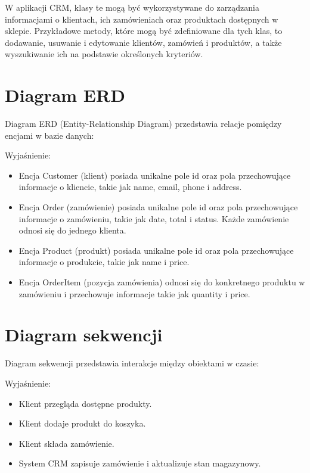 \documentclass[12pt,a4paper]{article}
\begin{document}
W aplikacji CRM, klasy te mogą być wykorzystywane do zarządzania informacjami o klientach, ich zamówieniach oraz produktach dostępnych w sklepie. Przykładowe metody, które mogą być zdefiniowane dla tych klas, to dodawanie, usuwanie i edytowanie klientów, zamówień i produktów, a także wyszukiwanie ich na podstawie określonych kryteriów.

\newpage

\section{Diagram ERD}
Diagram ERD (Entity-Relationship Diagram) przedstawia relacje pomiędzy encjami w bazie danych:

\vspace{12pt}Wyjaśnienie:
\begin{itemize}
    \item Encja Customer (klient) posiada unikalne pole id oraz pola przechowujące informacje o kliencie, takie jak name, email, phone i address.
    \item Encja Order (zamówienie) posiada unikalne pole id oraz pola przechowujące informacje o zamówieniu, takie jak date, total i status. Każde zamówienie odnosi się do jednego klienta.
    \item Encja Product (produkt) posiada unikalne pole id oraz pola przechowujące informacje o produkcie, takie jak name i price.
    \item Encja OrderItem (pozycja zamówienia) odnosi się do konkretnego produktu w zamówieniu i przechowuje informacje takie jak quantity i price.
\end{itemize}

\newpage

\section{Diagram sekwencji}
Diagram sekwencji przedstawia interakcje między obiektami w czasie:

\vspace{12pt}Wyjaśnienie:
\begin{itemize}
    \item Klient przegląda dostępne produkty.
    \item Klient dodaje produkt do koszyka.
    \item Klient składa zamówienie.
    \item System CRM zapisuje zamówienie i aktualizuje stan magazynowy.
\end{itemize}
\end{document}
